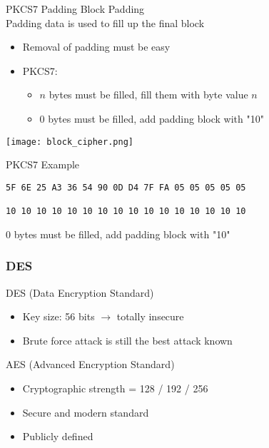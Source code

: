 \begin{concept}{PKCS7 Padding} Block Padding\\
    Padding data is used to fill up the final block
    \begin{itemize}
        \item Removal of padding must be easy
        \item PKCS7:
        \begin{itemize}
            \item $n$ bytes must be filled, fill them with byte value $n$
            \item 0 bytes must be filled, add padding block with "10"
        \end{itemize}
    \end{itemize}
\end{concept}



\texttt{[image: block\_cipher.png]}

\multend

\begin{examplecode}{PKCS7 Example}
\begin{lstlisting}[style=basesmol]
5F 6E 25 A3 36 54 90 0D D4 7F FA 05 05 05 05 05

10 10 10 10 10 10 10 10 10 10 10 10 10 10 10 10
\end{lstlisting}

0 bytes must be filled, add padding block with "10"
\end{examplecode}

\raggedcolumns
\columnbreak

\subsubsection{DES}


\begin{definition}{DES (Data Encryption Standard)}
    \begin{itemize}
        \item Key size: 56 bits $\rightarrow$ totally insecure
        \item Brute force attack is still the best attack known
    \end{itemize}
\end{definition}




\begin{concept}{AES (Advanced Encryption Standard)}
    \begin{itemize}
        \item Cryptographic strength = 128 / 192 / 256
        \item Secure and modern standard
        \item Publicly defined
    \end{itemize}
\end{concept}

